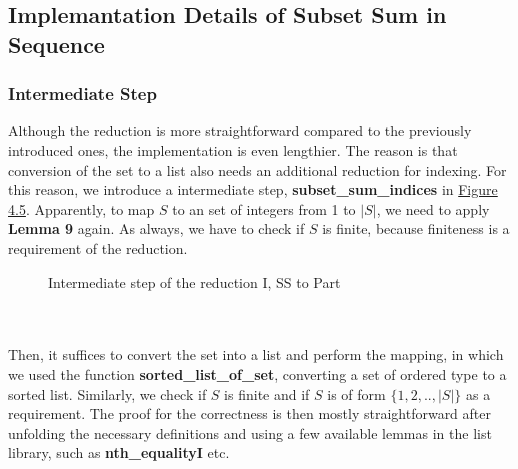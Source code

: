 \subsection{Implemantation Details of Subset Sum in Sequence}
\subsubsection*{Intermediate Step}
Although the reduction is more straightforward compared to the previously introduced ones, the implementation is even lengthier. 
The reason is that conversion of the set to a list also needs an additional reduction for indexing. For this reason, we introduce 
a intermediate step, \textbf{subset\_sum\_indices} in \hyperref[fig:4.5]{Figure 4.5}.
Apparently, to map $S$ to an set of integers from 1 to $|S|$, we need to apply \textbf{Lemma 9} again. 
As always, we have to check if $S$ is finite, because finiteness is a requirement of the reduction.
\begin{figure}[!h]
    \caption{Intermediate step of the reduction I, SS to Part}
    \label{fig:4.6}
\end{figure}\\\\
Then, it suffices to convert the set into a list and perform the mapping, in which we used the function 
\textbf{sorted\_list\_of\_set}, converting a set of ordered type to a sorted list. Similarly, we check if 
$S$ is finite and if $S$ is of form $\{1, 2, .. , |S|\}$ as a requirement. The proof for the correctness is then mostly straightforward
after unfolding the necessary definitions and using a few available lemmas in the list library, such as \textbf{nth\_equalityI} etc. 

